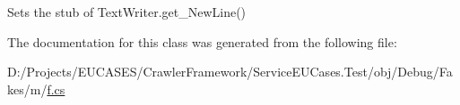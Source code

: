 Sets the stub of Text\-Writer.\-get\-\_\-\-New\-Line()



The documentation for this class was generated from the following file\-:\begin{DoxyCompactItemize}
\item 
D\-:/\-Projects/\-E\-U\-C\-A\-S\-E\-S/\-Crawler\-Framework/\-Service\-E\-U\-Cases.\-Test/obj/\-Debug/\-Fakes/m/\hyperlink{m_2f_8cs}{f.\-cs}\end{DoxyCompactItemize}
